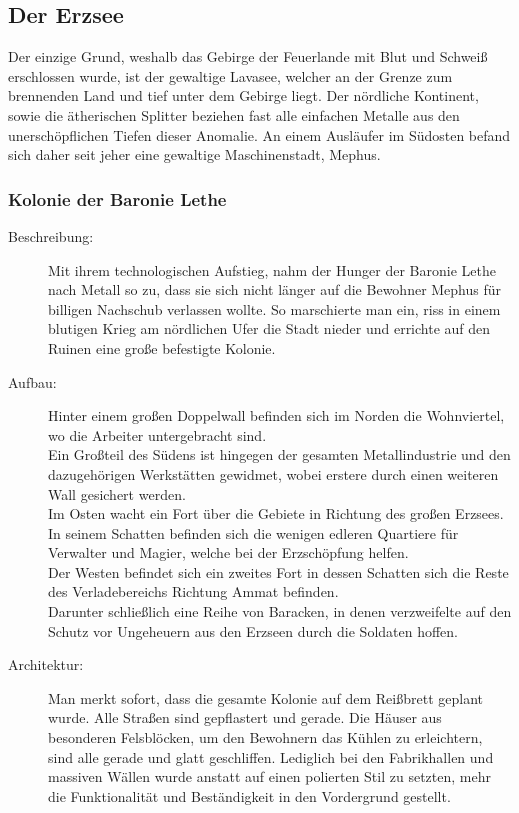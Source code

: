 \documentclass[a4paper,12pt,oneside]{book}
\begin{document}
\subsection{Der Erzsee}
Der einzige Grund, weshalb das Gebirge der Feuerlande mit Blut und Schweiß erschlossen wurde, ist der gewaltige Lavasee, welcher an der Grenze zum brennenden Land und tief unter dem Gebirge liegt. Der nördliche Kontinent, sowie die ätherischen Splitter beziehen fast alle einfachen Metalle aus den unerschöpflichen Tiefen dieser Anomalie. An einem Ausläufer im Südosten befand sich daher seit jeher eine gewaltige Maschinenstadt, Mephus.
\subsubsection{Kolonie der Baronie Lethe}
\begin{description}
\item[Beschreibung:]Mit ihrem technologischen Aufstieg, nahm der Hunger der Baronie Lethe nach Metall so zu, dass sie sich nicht länger auf die Bewohner Mephus für billigen Nachschub verlassen wollte. So marschierte man ein, riss in einem blutigen Krieg am nördlichen Ufer die Stadt nieder und errichte auf den Ruinen eine große befestigte Kolonie.
\item[Aufbau:]Hinter einem großen Doppelwall befinden sich im Norden die Wohnviertel, wo die Arbeiter untergebracht sind.
\\Ein Großteil des Südens ist hingegen der gesamten Metallindustrie und den dazugehörigen Werkstätten gewidmet, wobei erstere durch einen weiteren Wall gesichert werden.
\\Im Osten wacht ein Fort über die Gebiete in Richtung des großen Erzsees. In seinem Schatten befinden sich die wenigen edleren Quartiere für Verwalter und Magier, welche bei der Erzschöpfung helfen.
\\Der Westen befindet sich ein zweites Fort in dessen Schatten sich die Reste des Verladebereichs Richtung Ammat befinden.
\\Darunter schließlich eine Reihe von Baracken, in denen verzweifelte auf den Schutz vor Ungeheuern aus den Erzseen durch die Soldaten hoffen.
\item[Architektur:]Man merkt sofort, dass die gesamte Kolonie auf dem Reißbrett geplant wurde. Alle Straßen sind gepflastert und gerade. Die Häuser aus besonderen Felsblöcken, um den Bewohnern das Kühlen zu erleichtern, sind alle gerade und glatt geschliffen. Lediglich bei den Fabrikhallen und massiven Wällen wurde anstatt auf einen polierten Stil zu setzten, mehr die Funktionalität und Beständigkeit in den Vordergrund gestellt.
\end{description}
\end{document}
